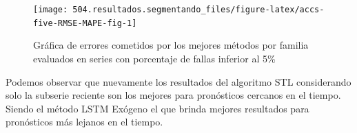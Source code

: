 \documentclass[]{book}
\begin{document}
\begin{table}[t]

\caption{\label{tab:accs-five-RMSE-MAPE}RMSE y MAPE para el mejor método de cada familia evaluado en series con porcentaje de fallas en los datos inferior al 5\%}
\centering
{}
\end{table}

\begin{figure}[H]

{\centering \texttt{[image: 504.resultados.segmentando\_files/figure-latex/accs-five-RMSE-MAPE-fig-1]} 

}

\caption{Gráfica de errores cometidos por los mejores métodos por familia evaluados en series con porcentaje de fallas inferior al 5\%}\label{fig:accs-five-RMSE-MAPE-fig}
\end{figure}

Podemos observar que nuevamente los resultados del algoritmo STL
considerando solo la subserie reciente son los mejores para pronósticos
cercanos en el tiempo. Siendo el método LSTM Exógeno el que brinda
mejores resultados para pronósticos más lejanos en el tiempo.
\end{document}
